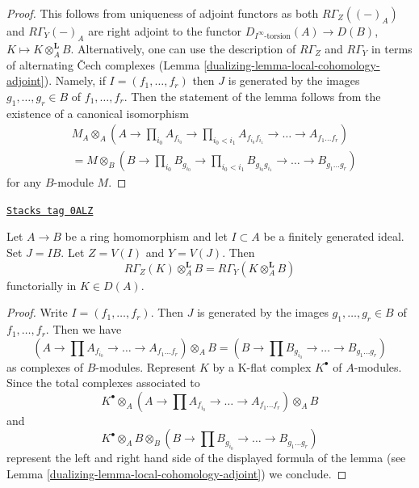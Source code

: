 \begin{proof}

This follows from uniqueness of adjoint functors as both
$R\Gamma_Z((-)_A)$ and $R\Gamma_Y(-)_A$
are right adjoint to the functor $D_{I^\infty\text{-torsion}}(A) \to D(B)$,
$K \mapsto K \otimes_A^\mathbf{L} B$.
Alternatively, one can use the description of $R\Gamma_Z$ and $R\Gamma_Y$
in terms of alternating {\v C}ech complexes
(Lemma \ref{dualizing-lemma-local-cohomology-adjoint}).
Namely, if $I = (f_1, \ldots, f_r)$ then $J$ is generated by the images
$g_1, \ldots, g_r \in B$ of $f_1, \ldots, f_r$.
Then the statement of the lemma follows from the existence of
a canonical isomorphism
\begin{align*}
& M_A \otimes_A (A \to \prod\nolimits_{i_0} A_{f_{i_0}} \to
\prod\nolimits_{i_0 < i_1} A_{f_{i_0}f_{i_1}}
\to \ldots \to A_{f_1\ldots f_r}) \\
& =
M \otimes_B (B \to \prod\nolimits_{i_0} B_{g_{i_0}} \to
\prod\nolimits_{i_0 < i_1} B_{g_{i_0}g_{i_1}}
\to \ldots \to B_{g_1\ldots g_r})
\end{align*}
for any $B$-module $M$.
\end{proof}

\begin{lemma}
\label{dualizing-lemma-torsion-change-rings}
\href{https://stacks.math.columbia.edu/tag/0ALZ}{\texttt{Stacks tag 0ALZ}}

Let $A \to B$ be a ring homomorphism and let $I \subset A$
be a finitely generated ideal. Set $J = IB$. Let $Z = V(I)$ and $Y = V(J)$.
Then
$$
R\Gamma_Z(K) \otimes_A^\mathbf{L} B = R\Gamma_Y(K \otimes_A^\mathbf{L} B)
$$
functorially in $K \in D(A)$.
\end{lemma}

\begin{proof}

Write $I = (f_1, \ldots, f_r)$. Then $J$ is generated by the images
$g_1, \ldots, g_r \in B$ of $f_1, \ldots, f_r$. Then we have
$$
(A \to \prod A_{f_{i_0}} \to \ldots \to A_{f_1\ldots f_r}) \otimes_A B =
(B \to \prod B_{g_{i_0}} \to \ldots \to B_{g_1\ldots g_r})
$$
as complexes of $B$-modules. Represent $K$ by a K-flat complex $K^\bullet$
of $A$-modules. Since the total complexes associated to
$$
K^\bullet \otimes_A
(A \to \prod A_{f_{i_0}} \to \ldots \to A_{f_1\ldots f_r}) \otimes_A B
$$
and
$$
K^\bullet \otimes_A B \otimes_B
(B \to \prod B_{g_{i_0}} \to \ldots \to B_{g_1\ldots g_r})
$$
represent the left and right hand side of the displayed formula of the
lemma (see Lemma \ref{dualizing-lemma-local-cohomology-adjoint}) we conclude.
\end{proof}

